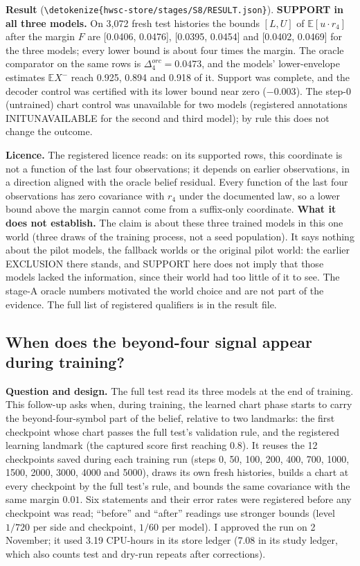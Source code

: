 \documentclass[11pt,a4paper]{article}
\newcommand{\E}{\mathbb{E}}
\DeclareRobustCommand{\_}{\ifmmode\origunderscore\else\textunderscore\allowbreak\fi}
\DeclareRobustCommand{\fpath}[1]{\begingroup\small\expandafter\nolinkurl\expandafter{\detokenize{#1}}\endgroup}
\begin{document}
\textbf{Result} (\fpath{hwsc-store/stages/S8/RESULT.json}). \textbf{SUPPORT in all three models.}
On 3,072 fresh test histories the bounds $[L,U]$ of $\E[u\cdot r_4]$ after the margin $F$ are
[0.0406, 0.0476], [0.0395, 0.0454] and [0.0402, 0.0469] for the three models; every lower bound
is about four times the margin. The oracle comparator on the same rows is
$\Delta_4^{orc}=0.0473$, and the models' lower-envelope estimates $\E X^-$ reach 0.925, 0.894 and
0.918 of it. Support was complete, and the decoder control was certified with its lower bound
near zero ($-0.003$). The step-0 (untrained) chart control was unavailable for two models
(registered annotations INIT\_UNAVAILABLE for the second and third model); by rule this does not
change the outcome.

\textbf{Licence.} The registered licence reads: on its supported rows, this coordinate is not a
function of the last four observations; it depends on earlier observations, in a direction
aligned with the oracle belief residual. Every function of the last four observations has zero
covariance with $r_4$ under the documented law, so a lower bound above the margin cannot come
from a suffix-only coordinate. \textbf{What it does not establish.} The claim is about these
three trained models in this one world (three draws of the training process, not a seed
population). It says nothing about the pilot models, the fallback worlds or the original pilot
world: the earlier EXCLUSION there stands, and SUPPORT here does not imply that those models
lacked the information, since their world had too little of it to see. The stage-A oracle
numbers motivated the world choice and are not part of the evidence. The full list of registered
qualifiers is in the result file.

\subsection{When does the beyond-four signal appear during training?}\label{sec:hwsd}
\textbf{Question and design.} The full test read its three models at the end of training. This
follow-up asks when, during training, the learned chart phase starts to carry the
beyond-four-symbol part of the belief, relative to two landmarks: the first checkpoint whose chart
passes the full test's validation rule, and the registered learning landmark (the captured score
first reaching 0.8). It reuses the 12 checkpoints saved during each training run (steps 0, 50,
100, 200, 400, 700, 1000, 1500, 2000, 3000, 4000 and 5000), draws its own fresh histories, builds
a chart at every checkpoint by the full test's rule, and bounds the same covariance with the same
margin $0.01$. Six statements and their error rates were registered before any checkpoint was
read; ``before'' and ``after'' readings use stronger bounds (level $1/720$ per side and
checkpoint, $1/60$ per model). I approved the run on 2 November; it used 3.19 CPU-hours in its
store ledger (7.08 in its study ledger, which also counts test and dry-run repeats after
corrections).
\end{document}
